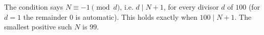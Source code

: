 The condition says $N\equiv-1\pmod d$, i.e. $d\mid N+1$, for every divisor $d$ of $100$ (for $d=1$ the remainder $0$ is automatic). This holds exactly when $100\mid N+1$. The smallest positive such $N$ is $\boxed{99}$.
